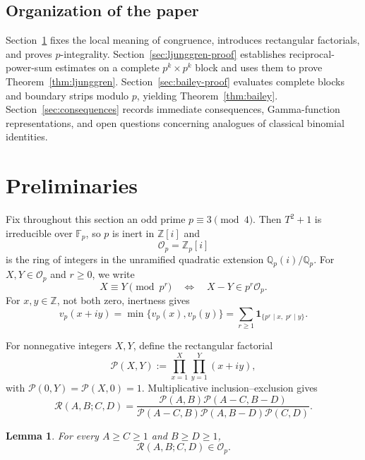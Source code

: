 \documentclass[a4paper,american,11pt]{amsart}
\numberwithin{equation}{section}
\newtheorem{lemma}[theorem]{Lemma}
\theoremstyle{definition}
\newcommand{\Z}{\mathbb Z}
\newcommand{\F}{\mathbb F}
\newcommand{\Op}{\mathcal O_p}
\newcommand{\Rect}{\mathcal R}
\newcommand{\Prect}{\mathcal P}
\newcommand{\vp}{v_p}
\begin{document}
\subsection*{Organization of the paper}
Section~\ref{sec:preliminaries} fixes the local meaning of congruence, introduces rectangular factorials, and proves $p$-integrality. Section~\ref{sec:ljunggren-proof} establishes reciprocal-power-sum estimates on a complete $p^k\times p^k$ block and uses them to prove Theorem~\ref{thm:ljunggren}. Section~\ref{sec:bailey-proof} evaluates complete blocks and boundary strips modulo $p$, yielding Theorem~\ref{thm:bailey}. Section~\ref{sec:consequences} records immediate consequences, Gamma-function representations, and open questions concerning analogues of classical binomial identities.


\section{ Preliminaries}\label{sec:preliminaries}

Fix throughout this section an odd prime $p\equiv 3\pmod 4$. Then $T^2+1$ is irreducible over $\F_p$, so $p$ is inert in $\Z[i]$ and
\[
\Op=\Z_p[i]
\]
is the ring of integers in the unramified quadratic extension $\mathbb Q_p(i)/\mathbb Q_p$. For $X,Y\in\Op$ and $r\geq 0$, we write
\[
X\equiv Y\pmod{p^r}
\quad\Longleftrightarrow\quad
X-Y\in p^r\Op.
\]
For $x,y\in\Z$, not both zero, inertness gives
\begin{equation}\label{eq:valuation-coordinatewise}
\vp(x+iy)=\min\{\vp(x),\vp(y)\}
=\sum_{r\geq 1}\mathbf 1_{\{p^r\mid x,\;p^r\mid y\}}.
\end{equation}

For nonnegative integers $X,Y$, define the rectangular factorial
\begin{equation}\label{eq:def-P}
\Prect(X,Y):=\prod_{x=1}^{X}\prod_{y=1}^{Y}(x+iy),
\end{equation}
with $\Prect(0,Y)=\Prect(X,0)=1$. Multiplicative inclusion--exclusion gives
\begin{equation}\label{eq:R-via-P}
\Rect(A,B;C,D)
=
\frac{\Prect(A,B)\Prect(A-C,B-D)}
{\Prect(A-C,B)\Prect(A,B-D)\Prect(C,D)}.
\end{equation}

\begin{lemma}\label{lem:integrality}
For every $A\geq C\geq 1$ and $B\geq D\geq 1$,
\[
\Rect(A,B;C,D)\in\Op.
\]
\end{lemma}
\end{document}
